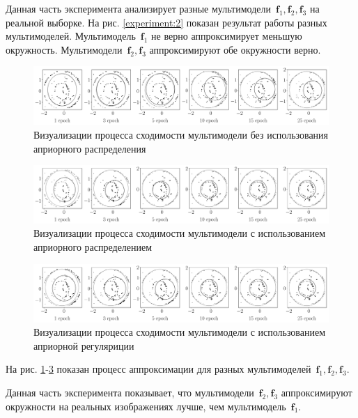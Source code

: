 Данная часть эксперимента анализирует разные мультимодели~$\textbf{f}_1, \textbf{f}_2, \textbf{f}_3$ на реальной выборке.
На рис. \ref{experiment:2} показан результат работы разных мультимоделей.
Мультимодель~$\textbf{f}_1$  не верно аппроксимирует меньшую окружность.
Мультимодели~$\textbf{f}_2, \textbf{f}_3$ аппроксимируют обе окружности верно.

\begin{figure}[h!t]\center
\includegraphics[width=1\textwidth]{results/priorexpert/experiment_real_not_prior}
\caption{Визуализации процесса сходимости мультимодели без использования априорного распределения}
\label{experiment:3}
\end{figure}

\begin{figure}[h!t]\center
\includegraphics[width=1\textwidth]{results/priorexpert/experiment_real_prior}
\caption{Визуализации процесса сходимости мультимодели с использованием априорного распределением}
\label{experiment:4}
\end{figure}

\begin{figure}[h!t]\center
\includegraphics[width=1\textwidth]{results/priorexpert/experiment_real_regular}
\caption{Визуализации процесса сходимости мультимодели с использованием априорной регуляриции}
\label{experiment:5}
\end{figure}

На рис. \ref{experiment:3}-\ref{experiment:5} показан процесс аппроксимации для разных мультимоделей~$\textbf{f}_1, \textbf{f}_2, \textbf{f}_3$.

Данная часть эксперимента показывает, что мультимодели~$\textbf{f}_2, \textbf{f}_3$ аппроксимируют окружности на реальных изображениях лучше, чем мультимодель~$\textbf{f}_1$.

